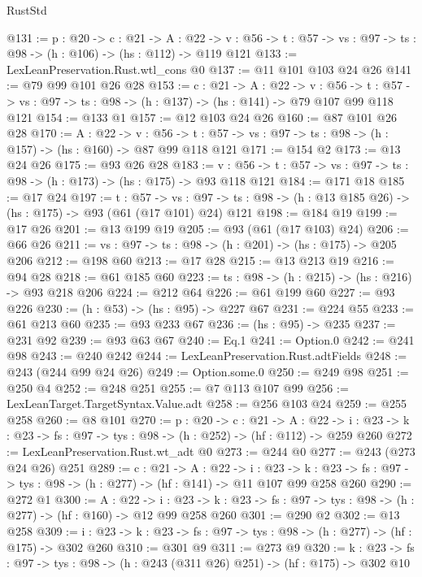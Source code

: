 \begin{lexlean}{RustStd}
\begin{coremodule}
{\begin{coremodule}
{@131 := {p : @20} ->
  {c : @21} ->
  {A : @22} ->
  {v : @56} -> {t : @57} -> {vs : @97} -> {ts : @98} -> (h : @106) -> (hs : @112) -> @119 @121
@133 := LexLeanPreservation.Rust.wtl_cons @0
@137 := @11 @101 @103 @24 @26
@141 := @79 @99 @101 @26 @28
@153 := {c : @21} ->
  {A : @22} ->
  {v : @56} ->
  {t : @57} -> {vs : @97} -> {ts : @98} -> (h : @137) -> (hs : @141) -> @79 @107 @99 @118 @121
@154 := @133 @1
@157 := @12 @103 @24 @26
@160 := @87 @101 @26 @28
@170 := {A : @22} ->
  {v : @56} ->
  {t : @57} -> {vs : @97} -> {ts : @98} -> (h : @157) -> (hs : @160) -> @87 @99 @118 @121
@171 := @154 @2
@173 := @13 @24 @26
@175 := @93 @26 @28
@183 := {v : @56} ->
  {t : @57} -> {vs : @97} -> {ts : @98} -> (h : @173) -> (hs : @175) -> @93 @118 @121
@184 := @171 @18
@185 := @17 @24
@197 := {t : @57} ->
  {vs : @97} -> {ts : @98} -> (h : @13 @185 @26) -> (hs : @175) -> @93 (@61 (@17 @101) @24) @121
@198 := @184 @19
@199 := @17 @26
@201 := @13 @199 @19
@205 := @93 (@61 (@17 @103) @24)
@206 := @66 @26
@211 := {vs : @97} -> {ts : @98} -> (h : @201) -> (hs : @175) -> @205 @206
@212 := @198 @60
@213 := @17 @28
@215 := @13 @213 @19
@216 := @94 @28
@218 := @61 @185 @60
@223 := {ts : @98} -> (h : @215) -> (hs : @216) -> @93 @218 @206
@224 := @212 @64
@226 := @61 @199 @60
@227 := @93 @226
@230 := (h : @53) -> (hs : @95) -> @227 @67
@231 := @224 @55
@233 := @61 @213 @60
@235 := @93 @233 @67
@236 := (hs : @95) -> @235
@237 := @231 @92
@239 := @93 @63 @67
@240 := Eq.{1}
@241 := Option.{0}
@242 := @241 @98
@243 := @240 @242
@244 := LexLeanPreservation.Rust.adtFields
@248 := @243 (@244 @99 @24 @26)
@249 := Option.some.{0}
@250 := @249 @98
@251 := @250 @4
@252 := @248 @251
@255 := @7 @113 @107 @99
@256 := LexLeanTarget.TargetSyntax.Value.adt
@258 := @256 @103 @24
@259 := @255 @258
@260 := @8 @101
@270 := {p : @20} ->
  {c : @21} ->
  {A : @22} ->
  {i : @23} -> {k : @23} -> {fs : @97} -> {tys : @98} -> (h : @252) -> (hf : @112) -> @259 @260
@272 := LexLeanPreservation.Rust.wt_adt @0
@273 := @244 @0
@277 := @243 (@273 @24 @26) @251
@289 := {c : @21} ->
  {A : @22} ->
  {i : @23} ->
  {k : @23} -> {fs : @97} -> {tys : @98} -> (h : @277) -> (hf : @141) -> @11 @107 @99 @258 @260
@290 := @272 @1
@300 := {A : @22} ->
  {i : @23} ->
  {k : @23} -> {fs : @97} -> {tys : @98} -> (h : @277) -> (hf : @160) -> @12 @99 @258 @260
@301 := @290 @2
@302 := @13 @258
@309 := {i : @23} ->
  {k : @23} -> {fs : @97} -> {tys : @98} -> (h : @277) -> (hf : @175) -> @302 @260
@310 := @301 @9
@311 := @273 @9
@320 := {k : @23} ->
  {fs : @97} -> {tys : @98} -> (h : @243 (@311 @26) @251) -> (hf : @175) -> @302 @10
}
\end{coremodule}}
\end{coremodule}
\end{lexlean}
